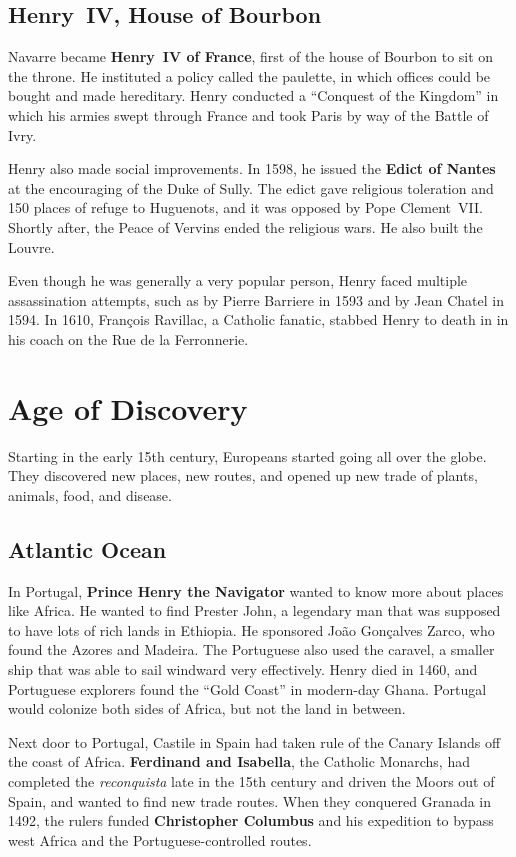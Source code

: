 \subsection*{Henry~IV, House of Bourbon}

Navarre became \textbf{Henry~IV of France}, first of the house of Bourbon to sit on the throne.
He instituted a policy called the paulette, in which offices could be bought and made hereditary.
Henry conducted a ``Conquest of the Kingdom'' in which his armies swept through France and took Paris
by way of the Battle of Ivry.

Henry also made social improvements.
In 1598, he issued the \textbf{Edict of Nantes} at the encouraging of the Duke of Sully.
The edict gave religious toleration and 150 places of refuge to Huguenots,
and it was opposed by Pope Clement~VII\@.
Shortly after, the Peace of Vervins ended the religious wars.
He also built the Louvre.

Even though he was generally a very popular person, Henry faced multiple assassination attempts,
such as by Pierre Barriere in 1593 and by Jean Chatel in 1594.
In 1610, Fran\c{c}ois Ravillac, a Catholic fanatic,
stabbed Henry to death in in his coach on the Rue de la Ferronnerie.

\section{Age of Discovery}

Starting in the early 15th century, Europeans started going all over the globe.
They discovered new places, new routes, and opened up new trade of plants, animals, food, and disease.

\subsection*{Atlantic Ocean}

In Portugal, \textbf{Prince Henry the Navigator} wanted to know more about places like Africa.
He wanted to find Prester John, a legendary man that was supposed to have lots of rich lands in Ethiopia.
He sponsored Jo\~ao Gon\c{c}alves Zarco, who found the Azores and Madeira.
The Portuguese also used the caravel, a smaller ship that was able to sail windward very effectively.
Henry died in 1460, and Portuguese explorers found the ``Gold Coast'' in modern-day Ghana.
Portugal would colonize both sides of Africa, but not the land in between.

Next door to Portugal, Castile in Spain had taken rule of the Canary Islands off the coast of Africa.
\textbf{Ferdinand and Isabella}, the Catholic Monarchs, had completed the \textit{reconquista}
late in the 15th century and driven the Moors out of Spain, and wanted to find new trade routes.
When they conquered Granada in 1492, the rulers funded \textbf{Christopher Columbus}
and his expedition to bypass west Africa and the Portuguese-controlled routes.

